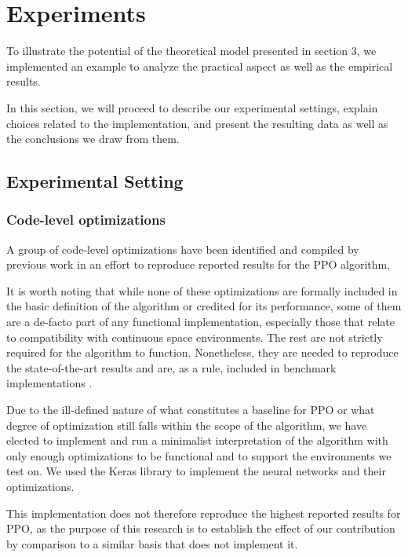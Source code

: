 \section{Experiments}
\label{sec:exp}
	To illustrate the potential of the theoretical model presented in section 3, we implemented an example to analyze the practical aspect as well as the empirical results.

In this section, we will proceed to describe our experimental settings, explain choices related to the implementation, and present the resulting data as well as the conclusions we draw from them.

\subsection{Experimental Setting}

\subsubsection{Code-level optimizations}

A group of code-level optimizations have been identified and compiled by previous work \cite{engstrom2020implementation}\cite{shengyi2022the37implementation} in an effort to reproduce reported results for the PPO algorithm. 

It is worth  noting that while none of these optimizations are formally included in the basic definition of the algorithm or credited for its performance, some of them are a de-facto part of any functional implementation, especially those that relate to compatibility with  continuous space environments. The rest are not strictly required for the algorithm to function. Nonetheless, they are needed to reproduce the state-of-the-art results and are, as a rule, included in benchmark implementations \cite{huang2021cleanrl} \cite{baselines}. %

Due to the ill-defined nature of what constitutes a baseline for PPO or what degree of optimization still falls within the scope of the algorithm, we have elected to implement and run a minimalist interpretation of the algorithm with only enough optimizations to be functional and to support the environments we test on. We used the Keras library to implement the neural networks and their optimizations.

This implementation does not therefore reproduce the highest reported results for PPO, as the purpose of this research is to establish the effect of our contribution by comparison to a similar basis that does not implement it.

